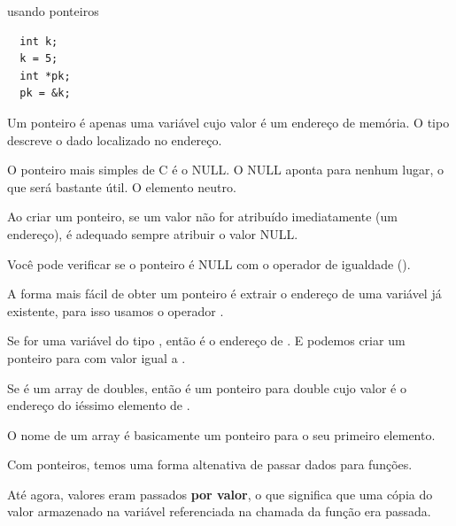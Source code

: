 \documentclass{beamer}
\begin{document}
\begin{frame}{usando ponteiros}
  \begin{center}
  \end{center}

  \begin{verbatim}
  int k;
  k = 5;
  int *pk;
  pk = &k;
  \end{verbatim}
  
  \framebreak

  Um ponteiro é apenas uma variável cujo valor é um endereço de
  memória. O tipo descreve o dado localizado no endereço.

  O ponteiro mais simples de C é o NULL. O NULL aponta para nenhum
  lugar, o que será bastante útil. O elemento neutro.

  Ao criar um ponteiro, se um valor não for atribuído imediatamente
  (um endereço), é adequado sempre atribuir o valor NULL.

  Você pode verificar se o ponteiro é NULL com o operador de igualdade
  (\ilcode{==}).

  \framebreak

  A forma mais fácil de obter um ponteiro é extrair o endereço de uma
  variável já existente, para isso usamos o operador \ilcode{\&}.

  Se  for uma variável do tipo , então
   é o endereço de . E podemos criar um ponteiro
  para  com valor igual a .

  Se  é um array de doubles, então  é um
  ponteiro para double cujo valor é o endereço do iéssimo elemento de
  .

  O nome de um array é basicamente um ponteiro para o seu primeiro
  elemento.

  \framebreak

  Com ponteiros, temos uma forma altenativa de passar dados para
  funções. 

  Até agora, valores eram passados \textbf{por valor}, o que significa
  que uma cópia do valor armazenado na variável referenciada na
  chamada da função era passada.


\end{frame}
\end{document}
